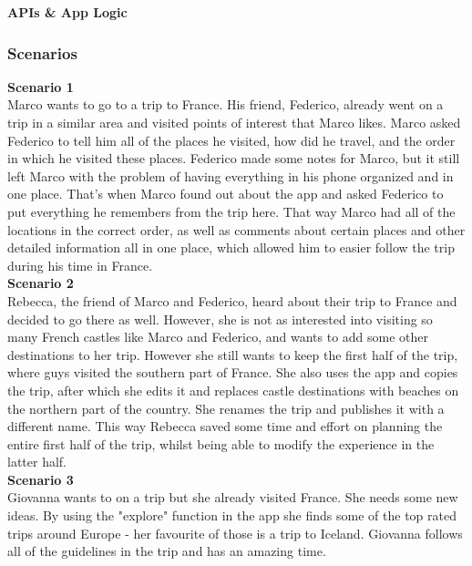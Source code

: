 \textbf{APIs \& App Logic}\\

\subsubsection{Scenarios}

\textbf{Scenario 1}\\

\hspace{\parindent}Marco wants to go to a trip to France. His friend, Federico, already went on a trip in a similar area and visited points of interest that Marco likes. Marco asked Federico to tell him all of the places he visited, how did he travel, and the order in which he visited these places. Federico made some notes for Marco, but it still left Marco with the problem of having everything in his phone organized and in one place. That's when Marco found out about the app and asked Federico to put everything he remembers from the trip here. That way Marco had all of the locations in the correct order, as well as comments about certain places and other detailed information all in one place, which allowed him to easier follow the trip during his time in France.\\

\textbf{Scenario 2}\\

\hspace{\parindent}Rebecca, the friend of Marco and Federico, heard about their trip to France and decided to go there as well. However, she is not as interested into visiting so many French castles like Marco and Federico, and wants to add some other destinations to her trip. However she still wants to keep the first half of the trip, where guys visited the southern part of France. She also uses the app and copies the trip, after which she edits it and replaces castle destinations with beaches on the northern part of the country. She renames the trip and publishes it with a different name. This way Rebecca saved some time and effort on planning the entire first half of the trip, whilst being able to modify the experience in the latter half.\\

\textbf{Scenario 3}\\

\hspace{\parindent}Giovanna wants to on a trip but she already visited France. She needs some new ideas. By using the "explore" function in the app she finds some of the top rated trips around Europe - her favourite of those is a trip to Iceland. Giovanna follows all of the guidelines in the trip and has an amazing time.\\

